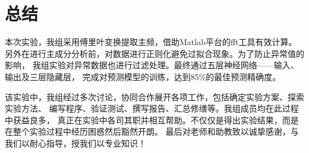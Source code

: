 \section{总结}

本次实验，我组采用傅里叶变换提取主频，借助Matlab平台的fft工具有效计算。
另外在进行主成分分析前，对数据进行正则化避免过拟合现象。为了防止异常值的影响，
我组实验对异常数据也进行过滤处理。最终通过五层神经网络——输入、输出及三层隐藏层，
完成对预测模型的训练，达到85\%的最佳预测精确度。

该实验中，我组经过多次讨论，协同合作展开各项工作，包括确定实验方案、探索实验方法、
编写程序、验证测试、撰写报告、汇总修缮等。我组成员均在此过程中获益良多，
真正在实验中各司其职并相互帮助。不仅仅是得出实验结果，而是在整个实验过程中经历困惑然后豁然开朗。
最后对老师和助教致以诚挚感谢，与我们以耐心指导，授我们以专业知识！
